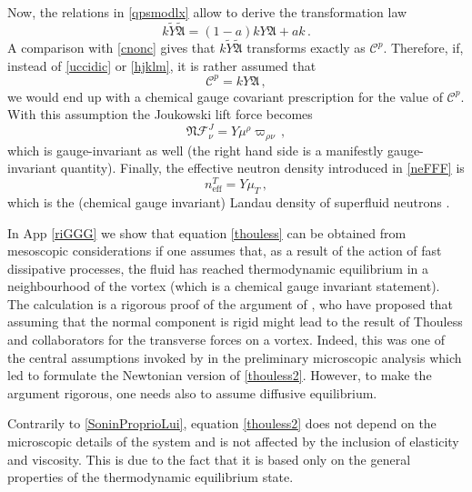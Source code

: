 \documentclass[preprints,article,accept,moreauthors,pdftex]{mdpi}
\begin{document}
Now, the relations in  \eqref{qpsmodlx} allow to derive the transformation law
\begin{equation}
k\tilde{Y}\tilde{\mathfrak{A}} = (1-a)kY\mathfrak{A} +ak \, .
\end{equation}
A comparison with \eqref{cnonc} gives that $k\tilde{Y}\tilde{\mathfrak{A}}$ transforms exactly  as $\mathcal{C}^p$. Therefore, if, instead of \eqref{uccidic} or \eqref{hjklm}, it is rather assumed that
\begin{equation}
\label{thouless}
\mathcal{C}^p = k Y \mathfrak{A} \, ,
\end{equation}
we would end up with a chemical gauge covariant prescription for the value of $\mathcal{C}^p$. With this assumption the Joukowski lift force becomes
\begin{equation}
\label{thouless2}
\mathfrak{N} \mathcal{F}^J_\nu = Y \mu^\rho \varpi_{\rho \nu} \, ,
\end{equation}
which is gauge-invariant as well (the right hand side is a manifestly gauge-invariant quantity). 
Finally, the effective neutron density introduced in \eqref{neFFF} is
\begin{equation}
n^T_{\text{eff}} = Y \mu_T \, ,
\end{equation}
which is the (chemical gauge invariant) Landau density of superfluid neutrons \cite{carter92}.

In App \ref{riGGG} we show that equation \eqref{thouless} can be obtained from mesoscopic considerations if one assumes that, as a result of the action of fast dissipative processes, the fluid has reached thermodynamic equilibrium in a neighbourhood of the vortex (which is a chemical gauge invariant statement). 
The calculation is a rigorous proof of the argument of \citet{Carter_Prix_Magnus}, who have proposed that assuming that the normal component is rigid might lead to the result of Thouless and collaborators for the transverse forces on a vortex. 
Indeed, this was one of the central assumptions invoked by \citet{TAN_original1996} in the preliminary microscopic analysis which led \citet{Wexler1997} to formulate the Newtonian version of \eqref{thouless2}. However, to make the argument rigorous, one needs also to assume diffusive equilibrium.

Contrarily to \eqref{SoninProprioLui}, equation \eqref{thouless2} does not depend on the microscopic details of the system and is not affected by the inclusion of elasticity and viscosity. This is due to the fact that it is based only on the general properties of the thermodynamic equilibrium state. 
\end{document}

